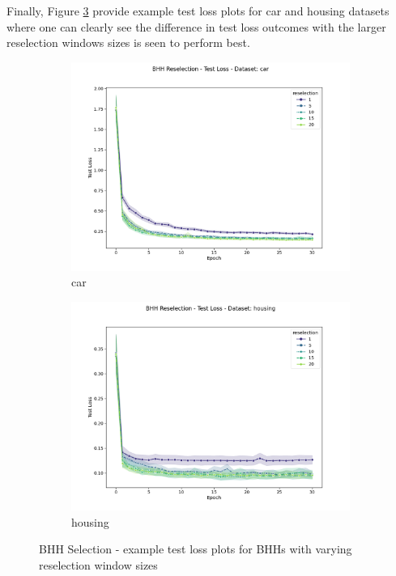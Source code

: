 Finally, Figure \ref{fig:results:reselection:figures:loss} provide example test loss plots for car and housing datasets where one can clearly see the difference in test loss outcomes with the larger reselection windows sizes is seen to perform best.

\begin{figure}[htbp]
	\begin{subfigure}{0.5\textwidth}
    	\centering
        \includegraphics[width=\textwidth]{analysis/bhh_reselection/figures/test/loss/car.png}
        \caption{car}
        \label{fig:results:reselection:figures:loss1}
	\end{subfigure}
	\begin{subfigure}{0.5\textwidth}
    	\centering
        \includegraphics[width=\textwidth]{analysis/bhh_reselection/figures/test/loss/housing.png}
        \caption{housing}
        \label{fig:results:reselection:figures:loss2}
	\end{subfigure}
	\caption{\Acs{BHH} Selection - example test loss plots for \Acsp{BHH} with varying reselection window sizes} 
	\label{fig:results:reselection:figures:loss}
\end{figure}

